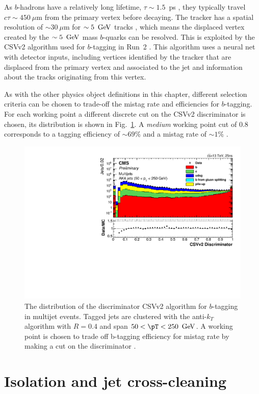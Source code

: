 As $b$-hadrons have a relatively long lifetime, $\tau\sim 1.5$~ps
\cite{PhysRevD.86.010001}, they typically travel $c\tau\sim 450~\mu$m
from the primary vertex before decaying. The \CMS tracker has a
spatial resolution of $\sim 30~\mu$m for $\sim 5~\mathrm{\,Ge\kern -0.1em V}$ tracks
\cite{Chatrchyan:2008aa}, which means the displaced vertex created by
the $\sim 5~\mathrm{\,Ge\kern -0.1em V}$ mass $b$-quarks can be resolved. This is exploited
by the \ac{CSVv2} algorithm used for $b$-tagging in Run~2
\cite{CMS-PAS-BTV-15-001}. This algorithm uses a neural net with
detector inputs, including vertices identified by the tracker that are
displaced from the primary vertex and associated to the jet and
information about the tracks originating from this vertex.

As with the other physics object definitions in this chapter,
different selection criteria can be chosen to trade-off the mistag
rate and efficiencies for $b$-tagging. For each working point a
different discrete cut on
the \ac{CSVv2} discriminator is chosen, its distribution is shown in
Fig.~\ref{fig:bTag}. A \emph{medium} working point cut of 0.8 corresponds to
a tagging efficiency of $\sim 69\%$ and a mistag rate of $\sim 1\%$
\cite{CMS-PAS-BTV-15-001}. 

\begin{figure}
\begin{center}
\includegraphics[width=0.7\linewidth]{figs/reconstruction/bTag} \end{center}
\caption{ The distribution of the discriminator \ac{CSVv2} algorithm
for $b$-tagging in multijet events. Tagged jets are clustered with the
anti-$k_T$ algorithm with $R=0.4$ and span $50<\pT<250~\gev$. A
working point is chosen to trade off b-tagging efficiency for mistag
rate by making a cut on the discriminator \cite{CMS-PAS-BTV-15-001}.}
\label{fig:bTag} \end{figure}

\section{Isolation and jet cross-cleaning}
\label{sec:reco_iso}

